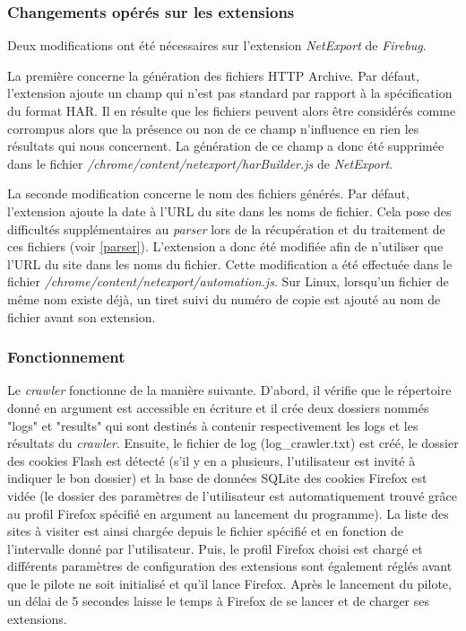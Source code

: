 \subsubsection{Changements opérés sur les extensions}
\label{changements_extensions}
Deux modifications ont été nécessaires sur l'extension \textit{NetExport} de \textit{Firebug}.

La première concerne la génération des fichiers HTTP Archive. Par défaut, l'extension ajoute un champ qui n'est pas standard par rapport à la spécification du format HAR. Il en résulte que les fichiers peuvent alors être considérés comme corrompus alors que la présence ou non de ce champ n'influence en rien les résultats qui nous concernent. La génération de ce champ a donc été supprimée dans le fichier \textit{/chrome/content/netexport/harBuilder.js} de \textit{NetExport}.

La seconde modification concerne le nom des fichiers générés. Par défaut, l'extension ajoute la date à l'URL du site dans les noms de fichier. Cela pose des difficultés supplémentaires au \textit{parser} lors de la récupération et du traitement de ces fichiers (voir \autoref{parser}). L'extension a donc été modifiée afin de n'utiliser que l'URL du site dans les noms du fichier. Cette modification a été effectuée dans le fichier \textit{/chrome/content/netexport/automation.js}. Sur Linux, lorsqu'un fichier de même nom existe déjà, un tiret suivi du numéro de copie est ajouté au nom de fichier avant son extension.

\subsubsection{Fonctionnement}
Le \textit{crawler} fonctionne de la manière suivante. D'abord, il vérifie que le répertoire donné en argument est accessible en écriture et il crée deux dossiers nommés "logs" et "results" qui sont destinés à contenir respectivement les logs et les résultats du \textit{crawler}. Ensuite, le fichier de log (log\_crawler.txt) est créé, le dossier des cookies Flash est détecté (s'il y en a plusieurs, l'utilisateur est invité à indiquer le bon dossier) et la base de données SQLite des cookies Firefox est vidée (le dossier des paramètres de l'utilisateur est automatiquement trouvé grâce au profil Firefox spécifié en argument au lancement du programme). La liste des sites à visiter est ainsi chargée depuis le fichier spécifié et en fonction de l'intervalle donné par l'utilisateur. Puis, le profil Firefox choisi est chargé et différents paramètres de configuration des extensions sont également réglés avant que le pilote ne soit initialisé et qu'il lance Firefox. Après le lancement du pilote, un délai de 5 secondes laisse le temps à Firefox de se lancer et de charger ses extensions.
\newline

